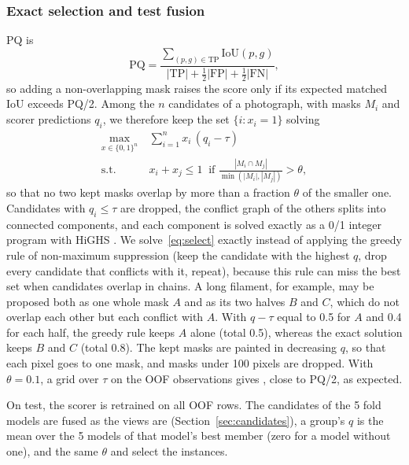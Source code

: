\documentclass[sigconf]{acmart}
\begin{document}
\subsubsection{Exact selection and test fusion}\label{sec:exact}
PQ \cite{kirillov2019panoptic} is
\begin{equation}
  \mathrm{PQ} = \frac{\sum_{(p,g) \in \mathrm{TP}} \mathrm{IoU}(p,g)}{|\mathrm{TP}| + \tfrac12 |\mathrm{FP}| + \tfrac12 |\mathrm{FN}|},
  \label{eq:pq}
\end{equation}
so adding a non-overlapping mask raises the score only if its expected matched IoU exceeds PQ/2. Among the $n$ candidates of a photograph, with masks $M_i$ and scorer predictions $q_i$, we therefore keep the set $\{i : x_i = 1\}$ solving
\begin{equation}
  \begin{aligned}
    \max_{x \in \{0,1\}^n}\ & \sum_{i=1}^{n} x_i\,(q_i - \tau) \\
    \text{s.t.}\ & x_i + x_j \le 1 \ \text{ if } \frac{|M_i \cap M_j|}{\min(|M_i|, |M_j|)} > \theta,
  \end{aligned}
  \label{eq:select}
\end{equation}
so that no two kept masks overlap by more than a fraction $\theta$ of the smaller one. Candidates with $q_i \le \tau$ are dropped, the conflict graph of the others splits into connected components, and each component is solved exactly as a 0/1 integer program with HiGHS \cite{huangfu2018highs}. We solve~\eqref{eq:select} exactly instead of applying the greedy rule of non-maximum suppression (keep the candidate with the highest $q$, drop every candidate that conflicts with it, repeat), because this rule can miss the best set when candidates overlap in chains. A long filament, for example, may be proposed both as one whole mask $A$ and as its two halves $B$ and $C$, which do not overlap each other but each conflict with $A$. With $q - \tau$ equal to 0.5 for $A$ and 0.4 for each half, the greedy rule keeps $A$ alone (total 0.5), whereas the exact solution keeps $B$ and $C$ (total 0.8). The kept masks are painted in decreasing $q$, so that each pixel goes to one mask, and masks under 100 pixels are dropped. With $\theta = 0.1$, a grid over $\tau$ on the OOF observations gives , close to PQ/2, as expected.

On test, the scorer is retrained on all OOF rows. The candidates of the 5 fold models are fused as the views are (Section~\ref{sec:candidates}), a group's $q$ is the mean over the 5 models of that model's best member (zero for a model without one), and the same $\theta$ and  select the instances.
\end{document}
